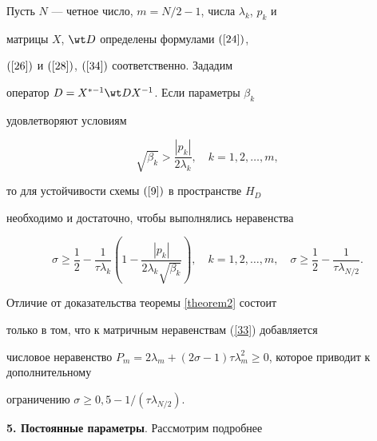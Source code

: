 \begin{thm}\label{theorem3}


Пусть $N$ --- четное число, $m=N/2-1$, числа $\lambda_k $, $p_k $ и


матрицы $X$, $\wt D$ определены формулами $(\ref{24})$,


$(\ref{26})$ и $(\ref{28})$, $(\ref{34})$ соответственно. Зададим


оператор $D=X^{*-1} \wt DX^{- 1}$. Если параметры $\beta_k$


удовлетворяют условиям


$$


\sqrt {\beta_k} > \frac{{| {p_k}|}} {{2\lambda_k


}},\quad k=1,2, \dotsc,m,


$$


то для устойчивости схемы $(\ref{9})$ в пространстве $H_D $


необходимо и достаточно, чтобы выполнялись неравенства


\begin{equation}\label{36}


\sigma \geqslant \frac{1}{2}- \frac{1}{\tau \lambda_{k}} \left (


1-\frac{|p_{k}|}{2\lambda_{k} \sqrt {\beta_{k}}}\right), \quad


k=1,2,\dotsc,m, \quad \sigma \geqslant \frac{1}{2}-


\frac{1}{\tau \lambda_{N/2}}.


\end{equation}


\end{thm}





\begin{pf}


Отличие от доказательства теоремы \ref{theorem2} состоит


только в том, что к матричным неравенствам (\ref{33}) добавляется


числовое неравенство $P_m=2\lambda_m+(2\sigma-1)\tau


\lambda_m^2 \geqslant 0$, которое приводит к дополнительному


ограничению $\sigma \geqslant 0{,}5-1/(\tau \lambda_{N/2})$.


\end{pf}





{\bf 5. Постоянные параметры}. Рассмотрим подробнее


